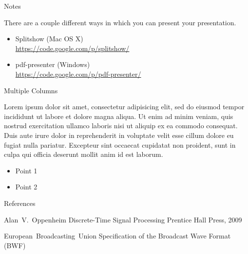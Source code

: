 \documentclass[compress]{beamer}
\begin{document}

\begin{frame}{Notes}
    
    There are a couple different ways in which you can present your presentation.

	\begin{itemize}
		\item Splitshow (Mac OS X)\\\url{https://code.google.com/p/splitshow/}
		\item pdf-presenter (Windows)\\\url{https://code.google.com/p/pdf-presenter/}
	\end{itemize}
\end{frame}



\begin{frame}{Multiple Columns}
	\begin{multicols}{2}
		Lorem ipsum dolor sit amet, consectetur adipisicing elit, sed do eiusmod
		tempor incididunt ut labore et dolore magna aliqua. Ut enim ad minim veniam,
		quis nostrud exercitation ullamco laboris nisi ut aliquip ex ea commodo
		consequat. Duis aute irure dolor in reprehenderit in voluptate velit esse
		cillum dolore eu fugiat nulla pariatur. Excepteur sint occaecat cupidatat non
		proident, sunt in culpa qui officia deserunt mollit anim id est laborum.
		\begin{itemize}
        	\item Point 1
        	\item Point 2
		\end{itemize}
	\end{multicols}
\end{frame}

\begin{frame}{References}
	\begin{thebibliography}{10}
    
	\beamertemplatebookbibitems
	Alan~V.~Oppenheim
	\newblock Discrete-Time Signal Processing
	\newblock Prentice Hall Press, 2009

	\beamertemplatearticlebibitems
	European~Broadcasting~Union
	\newblock Specification of the Broadcast Wave Format (BWF)
  \end{thebibliography}
\end{frame}
\end{document}
